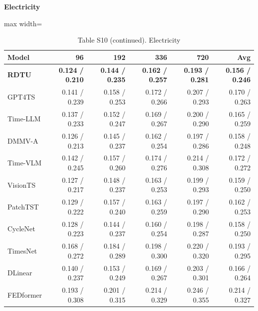 \begin{table}[H]\centering\small
\caption*{Table S10 (continued). Electricity}
\textbf{Electricity}\par\smallskip
\begin{adjustbox}{max width=\linewidth}\begin{tabular}{lrrrrr}\toprule
\textbf{Model} & \textbf{96} & \textbf{192} & \textbf{336} & \textbf{720} & \textbf{Avg}\\\midrule
\rowcolor{blue!5}
\textbf{RDTU} & \textbf{0.124 / 0.210} & \textbf{0.144 / 0.235} & \textbf{0.162 / 0.257} & \textbf{0.193 / 0.281} & \textbf{0.156 / 0.246}\\
GPT4TS & 0.141 / 0.239 & 0.158 / 0.253 & 0.172 / 0.266 & 0.207 / 0.293 & 0.170 / 0.263\\
Time-LLM & 0.137 / 0.233 & 0.152 / 0.247 & 0.169 / 0.267 & 0.200 / 0.290 & 0.165 / 0.259\\
DMMV-A & 0.126 / 0.213 & 0.145 / 0.237 & 0.162 / 0.254 & 0.197 / 0.286 & 0.158 / 0.248\\
Time-VLM & 0.142 / 0.245 & 0.157 / 0.260 & 0.174 / 0.276 & 0.214 / 0.308 & 0.172 / 0.272\\
VisionTS & 0.127 / 0.217 & 0.148 / 0.237 & 0.163 / 0.253 & 0.199 / 0.293 & 0.159 / 0.250\\
PatchTST & 0.129 / 0.222 & 0.157 / 0.240 & 0.163 / 0.259 & 0.197 / 0.290 & 0.162 / 0.253\\
CycleNet & 0.128 / 0.223 & 0.144 / 0.237 & 0.160 / 0.254 & 0.198 / 0.287 & 0.158 / 0.250\\
TimesNet & 0.168 / 0.272 & 0.184 / 0.289 & 0.198 / 0.300 & 0.220 / 0.320 & 0.193 / 0.295\\
DLinear & 0.140 / 0.237 & 0.153 / 0.249 & 0.169 / 0.267 & 0.203 / 0.301 & 0.166 / 0.264\\
FEDformer & 0.193 / 0.308 & 0.201 / 0.315 & 0.214 / 0.329 & 0.246 / 0.355 & 0.214 / 0.327\\
\bottomrule\end{tabular}\end{adjustbox}\end{table}
